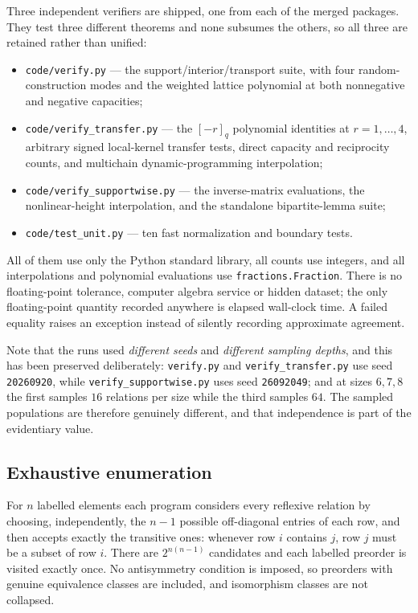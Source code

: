 \documentclass[11pt]{article}
\numberwithin{equation}{section}
\theoremstyle{definition}
\theoremstyle{remark}
\newcommand{\qint}[1]{[#1]_q}
\begin{document}
Three independent verifiers are shipped, one from each of the merged
packages. They test three different theorems and none subsumes the others, so
all three are retained rather than unified:
\begin{itemize}
\item \texttt{code/verify.py} --- the support/interior/transport suite, with
 four random-construction modes and the weighted lattice polynomial at both
 nonnegative and negative capacities;
\item \texttt{code/verify\_transfer.py} --- the $\qint{-r}$ polynomial
 identities at $r=1,\ldots,4$, arbitrary signed local-kernel transfer tests,
 direct capacity and reciprocity counts, and multichain dynamic-programming
 interpolation;
\item \texttt{code/verify\_supportwise.py} --- the inverse-matrix evaluations,
 the nonlinear-height interpolation, and the standalone bipartite-lemma suite;
\item \texttt{code/test\_unit.py} --- ten fast normalization and boundary
 tests.
\end{itemize}
All of them use only the Python standard library, all counts use integers, and
all interpolations and polynomial evaluations use
\texttt{fractions.Fraction}. There is no floating-point tolerance, computer
algebra service or hidden dataset; the only floating-point quantity recorded
anywhere is elapsed wall-clock time. A failed equality raises an exception
instead of silently recording approximate agreement.

Note that the runs used \emph{different seeds} and \emph{different sampling
depths}, and this has been preserved deliberately: \texttt{verify.py} and
\texttt{verify\_transfer.py} use seed \texttt{20260920}, while
\texttt{verify\_supportwise.py} uses seed \texttt{26092049}; and at sizes
$6,7,8$ the first samples $16$ relations per size while the third samples
$64$. The sampled populations are therefore genuinely different, and that
independence is part of the evidentiary value.

\subsection{Exhaustive enumeration}

For $n$ labelled elements each program considers every reflexive relation by
choosing, independently, the $n-1$ possible off-diagonal entries of each row,
and then accepts exactly the transitive ones: whenever row $i$ contains $j$,
row $j$ must be a subset of row $i$. There are $2^{n(n-1)}$ candidates and
each labelled preorder is visited exactly once. No antisymmetry condition is
imposed, so preorders with genuine equivalence classes are included, and
isomorphism classes are not collapsed.
\end{document}
